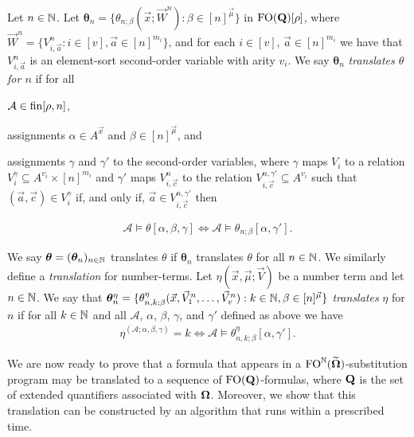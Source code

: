 \documentclass[../main/thesis.tex]{subfiles}
\begin{document}
Let $n \in \mathbb{N}$. Let $\boldsymbol{\theta}_n = \{\theta_{n; \beta}(\vec{x};
\vec{W}^n) : \beta \in [n]^{\vec{\mu}} \}$ in $\text{\upshape FO}(\mathbf{Q})[\rho]$, where
$\vec{W}^n = \{ V^n_{i, \vec{a}} : i \in [v], \vec{a} \in [n]^{m_i}\}$, and for
each $i \in [v]$, $\vec{a} \in [n]^{m_i}$ we have that $V^n_{i, \vec{a}}$ is an
element-sort second-order variable with arity $v_i$. We say
$\boldsymbol{\theta}_n$ \emph{translates $\theta$ for $n$} if for all
\begin{myenum}
\item $\mathcal{A} \in \text{\upshape fin}[\rho, n]$,
\item assignments $\alpha \in A^{\vec{x}}$ and $\beta \in [n]^{\vec{\mu}}$, and
\item assignments $\gamma$ and $\gamma'$ to the second-order variables, where
  $\gamma$ maps $V_i$ to a relation $V^{\gamma}_i \subseteq A^{v_i} \times
  [n]^{m_i}$ and $\gamma'$ maps $V^n_{i, \vec{c}}$ to the relation $V^{n,
    \gamma'}_{i, \vec{c}} \subseteq A^{v_i}$ such that $(\vec{a}, \vec{c}) \in
  V^{\gamma}_{i}$ if, and only if, $\vec{a} \in V^{n, \gamma'}_{i, \vec{c}}$
  then
\end{myenum}
\vspace{-2.8mm}
\begin{align*}
  \mathcal{A} \models \theta [\alpha , \beta, \gamma]  \iff \mathcal{A} \models \theta_{n;\beta} [\alpha, \gamma'].
\end{align*}

We say $\boldsymbol{\theta} = (\boldsymbol{\theta}_n)_{n \in \mathbb{N}}$ translates
$\theta$ if $\boldsymbol{\theta}_n$ translates $\theta$ for all $n \in \mathbb{N}$.
We similarly define a \emph{translation} for number-terms. Let $\eta(\vec{x},
\vec{\mu}; \vec{V})$ be a number term and let $n \in \mathbb{N}$. We say that
$\boldsymbol{\theta}^{\eta}_n = \{\theta^{\eta}_{n, k; \beta}(\vec{x},
\vec{V}^n_1, \ldots, \vec{V}^n_{v}) : k \in \mathbb{N}, \beta \in [n]^{\vec{\mu}} \}$
\emph{translates} $\eta$ for $n$ if for all $k \in \mathbb{N}$ and all $\mathcal{A}$,
$\alpha$, $\beta$, $\gamma$, and $\gamma'$ defined as above we have
\begin{align*}
  \eta^{(\mathcal{A}; \alpha, \beta, \gamma)} = k \iff \mathcal{A} \models \theta^{\eta}_{n, k; \beta}[\alpha, \gamma'].
\end{align*}

We are now ready to prove that a formula that appears in a
$\text{\upshape FO}^{\mathbb{N}} (\widetilde{\mathbf{\mathbf{\Omega}}})$-substitution program may be translated to a
sequence of $\text{\upshape FO}(\mathbf{Q})$-formulas, where $\mathbf{Q}$ is the set of extended
quantifiers associated with $\mathbf{\mathbf{\Omega}}$. Moreover, we show that this translation
can be constructed by an algorithm that runs within a prescribed time.
\end{document}
